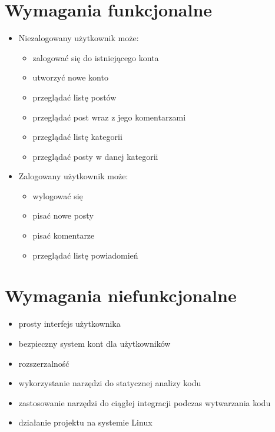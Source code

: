 \documentclass[declaration,shortabstract]{iithesis}
\begin{document}
\section{Wymagania funkcjonalne}

\begin{itemize}
    \item Niezalogowany użytkownik może: 
    \begin{itemize}
         \item zalogować się do istniejącego konta
         \item utworzyć nowe konto
         \item przeglądać listę postów
         \item przeglądać post wraz z jego komentarzami
         \item przeglądać listę kategorii
         \item przeglądać posty w danej kategorii
    \end{itemize}
    \item Zalogowany użytkownik może:
        \begin{itemize}
            \item wylogować się
            \item pisać nowe posty
            \item pisać komentarze
            \item przeglądać listę powiadomień
        \end{itemize}
\end{itemize}

\section{Wymagania niefunkcjonalne}
\begin{itemize}
    \item prosty interfejs użytkownika
    \item bezpieczny system kont dla użytkowników
    \item rozszerzalność
    \item wykorzystanie narzędzi do statycznej analizy kodu
    \item zastosowanie narzędzi do ciągłej integracji podczas wytwarzania kodu
    \item działanie projektu na systemie Linux
    
\end{itemize}

\end{document}
